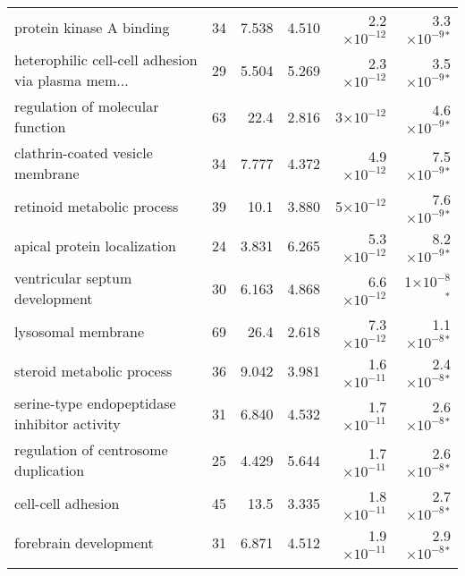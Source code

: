 \begin{longtable}{|l|r|r|r|r|r|}
                          protein kinase A binding &                      34 &                   7.538 &      4.510 & 2.2$\times 10^{-12}$ &   3.3$\times 10^{-9}$$\bm{^*}$ \\
 heterophilic cell-cell adhesion via plasma mem... &                      29 &                   5.504 &      5.269 & 2.3$\times 10^{-12}$ &   3.5$\times 10^{-9}$$\bm{^*}$ \\
                  regulation of molecular function &                      63 &                    22.4 &      2.816 &   3$\times 10^{-12}$ &   4.6$\times 10^{-9}$$\bm{^*}$ \\
                  clathrin-coated vesicle membrane &                      34 &                   7.777 &      4.372 & 4.9$\times 10^{-12}$ &   7.5$\times 10^{-9}$$\bm{^*}$ \\
                        retinoid metabolic process &                      39 &                    10.1 &      3.880 &   5$\times 10^{-12}$ &   7.6$\times 10^{-9}$$\bm{^*}$ \\
                       apical protein localization &                      24 &                   3.831 &      6.265 & 5.3$\times 10^{-12}$ &   8.2$\times 10^{-9}$$\bm{^*}$ \\
                    ventricular septum development &                      30 &                   6.163 &      4.868 & 6.6$\times 10^{-12}$ &     1$\times 10^{-8}$$\bm{^*}$ \\
                                lysosomal membrane &                      69 &                    26.4 &      2.618 & 7.3$\times 10^{-12}$ &   1.1$\times 10^{-8}$$\bm{^*}$ \\
                         steroid metabolic process &                      36 &                   9.042 &      3.981 & 1.6$\times 10^{-11}$ &   2.4$\times 10^{-8}$$\bm{^*}$ \\
      serine-type endopeptidase inhibitor activity &                      31 &                   6.840 &      4.532 & 1.7$\times 10^{-11}$ &   2.6$\times 10^{-8}$$\bm{^*}$ \\
              regulation of centrosome duplication &                      25 &                   4.429 &      5.644 & 1.7$\times 10^{-11}$ &   2.6$\times 10^{-8}$$\bm{^*}$ \\
                                cell-cell adhesion &                      45 &                    13.5 &      3.335 & 1.8$\times 10^{-11}$ &   2.7$\times 10^{-8}$$\bm{^*}$ \\
                             forebrain development &                      31 &                   6.871 &      4.512 & 1.9$\times 10^{-11}$ &   2.9$\times 10^{-8}$$\bm{^*}$ \\
$$
\end{longtable}
